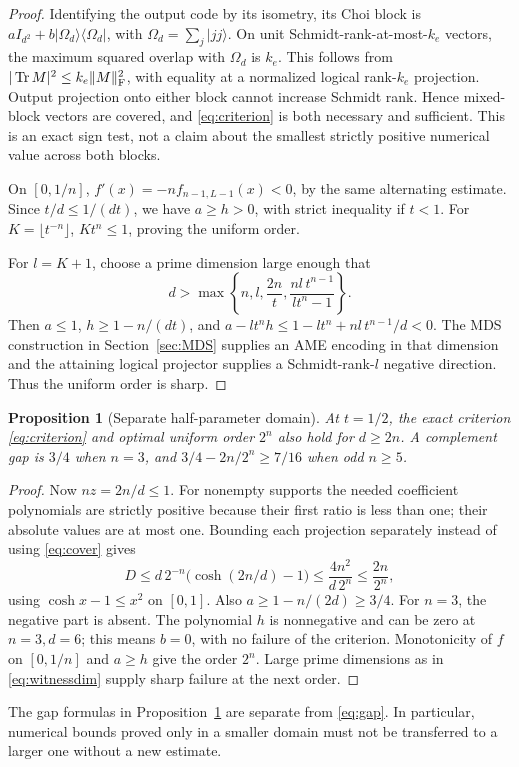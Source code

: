 \documentclass[11pt,a4paper]{article}
\newtheorem{proposition}[theorem]{Proposition}
\newcommand{\Tr}{\operatorname{Tr}}
\begin{document}
\begin{proof}
Identifying the output code by its isometry, its Choi block is
\(aI_{d^2}+b|\Omega_d\rangle\langle\Omega_d|\), with
\(\Omega_d=\sum_j|jj\rangle\). On unit Schmidt-rank-at-most-\(k_e\) vectors,
the maximum squared overlap with \(\Omega_d\) is \(k_e\). This follows from
\(|\Tr M|^2\le k_e\|M\|_{\rm F}^2\), with equality at a normalized logical rank-\(k_e\) projection. Output projection onto either block cannot increase Schmidt rank. Hence mixed-block vectors are covered, and \eqref{eq:criterion} is both necessary and sufficient. This is an exact sign test, not a claim about the smallest strictly positive numerical value across both blocks.

On \([0,1/n]\),
\(f'(x)=-n f_{n-1,L-1}(x)<0\), by the same alternating estimate.
Since \(t/d\le1/(dt)\), we have \(a\ge h>0\), with strict inequality if \(t<1\).
For \(K=\lfloor t^{-n}\rfloor\), \(K t^n\le1\), proving the uniform order.

For \(l=K+1\), choose a prime dimension large enough that
\begin{equation}\label{eq:witnessdim}
 d>\max\left\{n,l,\frac{2n}{t},
       \frac{nl\,t^{n-1}}{lt^n-1}\right\}.
\end{equation}
Then \(a\le1\), \(h\ge1-n/(dt)\), and
\(a-lt^n h\le1-lt^n+nl\,t^{n-1}/d<0\).
The MDS construction in Section~\ref{sec:MDS} supplies an AME encoding in that dimension and the attaining logical projector supplies a Schmidt-rank-\(l\) negative direction. Thus the uniform order is sharp.
\end{proof}

\begin{proposition}[Separate half-parameter domain]\label{prop:endpoint}
At \(t=1/2\), the exact criterion \eqref{eq:criterion} and optimal uniform order \(2^n\) also hold for \(d\ge2n\). A complement gap is \(3/4\) when \(n=3\), and
\(3/4-2n/2^n\ge7/16\) when odd \(n\ge5\).
\end{proposition}
\begin{proof}
Now \(nz=2n/d\le1\). For nonempty supports the needed coefficient polynomials are strictly positive because their first ratio is less than one; their absolute values are at most one. Bounding each projection separately instead of using \eqref{eq:cover} gives
\[
 D\le d\,2^{-n}\bigl(\cosh(2n/d)-1\bigr)
       \le\frac{4n^2}{d\,2^n}\le\frac{2n}{2^n},
\]
using \(\cosh x-1\le x^2\) on \([0,1]\).
Also \(a\ge1-n/(2d)\ge3/4\). For \(n=3\), the negative part is absent. The polynomial \(h\) is nonnegative and can be zero at \(n=3,d=6\); this means \(b=0\), with no failure of the criterion. Monotonicity of \(f\) on \([0,1/n]\) and \(a\ge h\) give the order \(2^n\). Large prime dimensions as in \eqref{eq:witnessdim} supply sharp failure at the next order.
\end{proof}
The gap formulas in Proposition~\ref{prop:endpoint} are separate from \eqref{eq:gap}. In particular, numerical bounds proved only in a smaller domain must not be transferred to a larger one without a new estimate.
\end{document}

